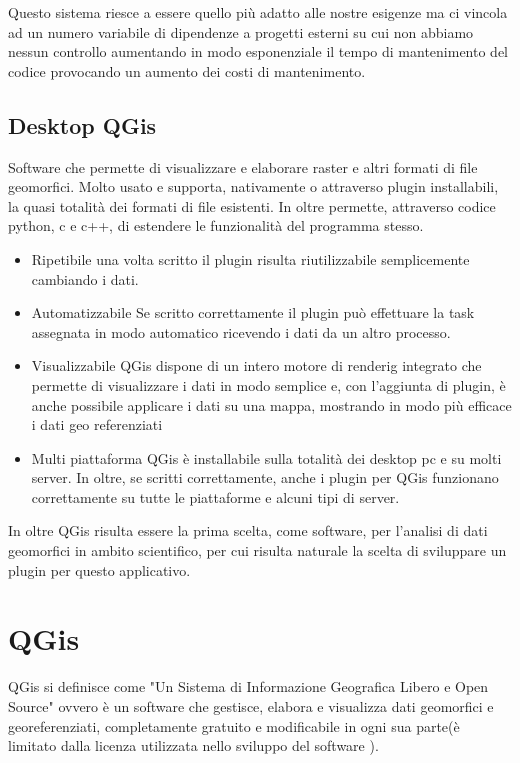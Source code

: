 Questo sistema riesce a essere quello più adatto alle nostre esigenze ma ci vincola ad un numero variabile di dipendenze a progetti esterni su cui non abbiamo nessun controllo aumentando in modo esponenziale il tempo di mantenimento del codice provocando un aumento dei costi di mantenimento.

\subsection{Desktop QGis}

Software che permette di visualizzare e elaborare raster e altri formati di file geomorfici. Molto usato e supporta, nativamente o attraverso plugin installabili, la quasi totalità dei formati di file esistenti. In oltre permette, attraverso codice python, c e c++, di estendere le funzionalità del programma stesso.

\begin{itemize}
	\item{Ripetibile} una volta scritto il plugin risulta riutilizzabile semplicemente cambiando i dati.

	\item{Automatizzabile} Se scritto correttamente il plugin può effettuare la task assegnata in modo automatico ricevendo i dati da un altro processo.

	\item{Visualizzabile} QGis dispone di un intero motore di renderig integrato che permette di visualizzare i dati in modo semplice e, con l'aggiunta di plugin, è anche possibile applicare i dati su una mappa, mostrando in modo più efficace i dati geo referenziati

	\item{Multi piattaforma} QGis è installabile sulla totalità dei desktop pc e su molti server. In oltre, se scritti correttamente, anche i plugin per QGis funzionano correttamente su tutte le piattaforme e alcuni tipi di server.
\end{itemize}

In oltre QGis risulta essere la prima scelta, come software, per l'analisi di dati geomorfici in ambito scientifico, per cui risulta naturale la scelta di sviluppare un plugin per questo applicativo.

\section{QGis}

QGis si definisce come "Un Sistema di Informazione Geografica Libero e Open Source"\cite{site:qgis} ovvero è un software che gestisce, elabora e visualizza dati geomorfici e georeferenziati, completamente gratuito e modificabile in ogni sua parte(è limitato dalla licenza utilizzata nello sviluppo del software \cite{site:cc3}).


